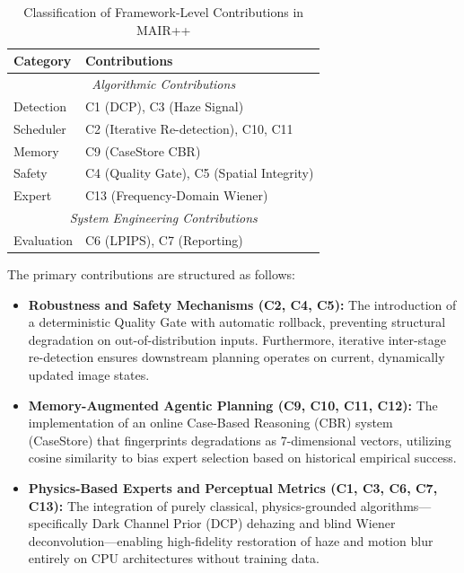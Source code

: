 \documentclass[journal, 10pt]{IEEEtran}
\begin{document}
\begin{table}[h]
\caption{Classification of Framework-Level Contributions in MAIR++}
\label{tab:contributions}
\centering
\begin{tabular}{ll}
\toprule
\textbf{Category} & \textbf{Contributions} \\
\midrule
\multicolumn{2}{c}{\textit{Algorithmic Contributions}} \\
Detection & C1 (DCP), C3 (Haze Signal) \\
Scheduler & C2 (Iterative Re-detection), C10, C11 \\
Memory & C9 (CaseStore CBR) \\
Safety & C4 (Quality Gate), C5 (Spatial Integrity) \\
Expert & C13 (Frequency-Domain Wiener) \\
\midrule
\multicolumn{2}{c}{\textit{System Engineering Contributions}} \\
Evaluation & C6 (LPIPS), C7 (Reporting) \\
\bottomrule
\end{tabular}
\end{table}

The primary contributions are structured as follows:
\begin{itemize}
    \item \textbf{Robustness and Safety Mechanisms (C2, C4, C5):} The introduction of a deterministic Quality Gate with automatic rollback, preventing structural degradation on out-of-distribution inputs. Furthermore, iterative inter-stage re-detection ensures downstream planning operates on current, dynamically updated image states.
    \item \textbf{Memory-Augmented Agentic Planning (C9, C10, C11, C12):} The implementation of an online Case-Based Reasoning (CBR) system (CaseStore) that fingerprints degradations as 7-dimensional vectors, utilizing cosine similarity to bias expert selection based on historical empirical success.
    \item \textbf{Physics-Based Experts and Perceptual Metrics (C1, C3, C6, C7, C13):} The integration of purely classical, physics-grounded algorithms—specifically Dark Channel Prior (DCP) dehazing and blind Wiener deconvolution—enabling high-fidelity restoration of haze and motion blur entirely on CPU architectures without training data.
\end{itemize}
\end{document}

